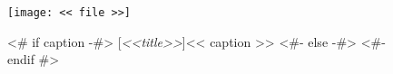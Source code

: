 {%
    \thispagestyle{empty}%
    \begin{landscape}%
      \begin{figure}
        \hspace{-10pt}\begin{minipage}[t]{7.8in}
          \texttt{[image: << file >>]}
        \end{minipage}\hfill
        \hspace{5pt}
        \begin{minipage}[b]{1.2in}
          <# if caption -#>
          [\textit{<<title>>}]{<< caption >>}
          <#- else -#>
          <#- endif #>\label{fig:<< id >>}
        \end{minipage}
      \end{figure}
    \end{landscape}
    \clearpage%
}
